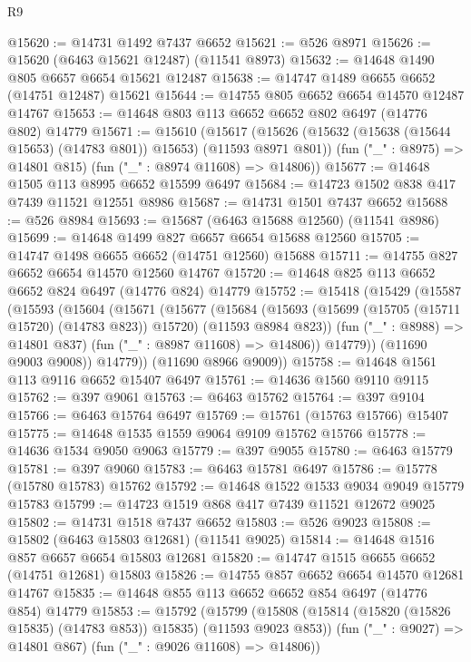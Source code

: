 \begin{lexlean}{R9}
\begin{coremodule}
@15620 := @14731 @1492 @7437 @6652
@15621 := @526 @8971
@15626 := @15620 (@6463 @15621 @12487) (@11541 @8973)
@15632 := @14648 @1490 @805 @6657 @6654 @15621 @12487
@15638 := @14747 @1489 @6655 @6652 (@14751 @12487) @15621
@15644 := @14755 @805 @6652 @6654 @14570 @12487 @14767
@15653 := @14648 @803 @113 @6652 @6652 @802 @6497 (@14776 @802) @14779
@15671 := @15610
    (@15617
      (@15626 (@15632 (@15638 (@15644 @15653) (@14783 @801)) @15653) (@11593 @8971 @801))
      (fun ("_" : @8975) => @14801 @815)
      (fun ("_" : @8974 @11608) => @14806))
@15677 := @14648 @1505 @113 @8995 @6652 @15599 @6497
@15684 := @14723 @1502 @838 @417 @7439 @11521 @12551 @8986
@15687 := @14731 @1501 @7437 @6652
@15688 := @526 @8984
@15693 := @15687 (@6463 @15688 @12560) (@11541 @8986)
@15699 := @14648 @1499 @827 @6657 @6654 @15688 @12560
@15705 := @14747 @1498 @6655 @6652 (@14751 @12560) @15688
@15711 := @14755 @827 @6652 @6654 @14570 @12560 @14767
@15720 := @14648 @825 @113 @6652 @6652 @824 @6497 (@14776 @824) @14779
@15752 := @15418
    (@15429
      (@15587
        (@15593
          (@15604
            (@15671
              (@15677
                (@15684
                  (@15693
                    (@15699 (@15705 (@15711 @15720) (@14783 @823)) @15720)
                    (@11593 @8984 @823))
                  (fun ("_" : @8988) => @14801 @837)
                  (fun ("_" : @8987 @11608) => @14806))
                @14779))
            (@11690 @9003 @9008))
          @14779))
      (@11690 @8966 @9009))
@15758 := @14648 @1561 @113 @9116 @6652 @15407 @6497
@15761 := @14636 @1560 @9110 @9115
@15762 := @397 @9061
@15763 := @6463 @15762
@15764 := @397 @9104
@15766 := @6463 @15764 @6497
@15769 := @15761 (@15763 @15766) @15407
@15775 := @14648 @1535 @1559 @9064 @9109 @15762 @15766
@15778 := @14636 @1534 @9050 @9063
@15779 := @397 @9055
@15780 := @6463 @15779
@15781 := @397 @9060
@15783 := @6463 @15781 @6497
@15786 := @15778 (@15780 @15783) @15762
@15792 := @14648 @1522 @1533 @9034 @9049 @15779 @15783
@15799 := @14723 @1519 @868 @417 @7439 @11521 @12672 @9025
@15802 := @14731 @1518 @7437 @6652
@15803 := @526 @9023
@15808 := @15802 (@6463 @15803 @12681) (@11541 @9025)
@15814 := @14648 @1516 @857 @6657 @6654 @15803 @12681
@15820 := @14747 @1515 @6655 @6652 (@14751 @12681) @15803
@15826 := @14755 @857 @6652 @6654 @14570 @12681 @14767
@15835 := @14648 @855 @113 @6652 @6652 @854 @6497 (@14776 @854) @14779
@15853 := @15792
    (@15799
      (@15808 (@15814 (@15820 (@15826 @15835) (@14783 @853)) @15835) (@11593 @9023 @853))
      (fun ("_" : @9027) => @14801 @867)
      (fun ("_" : @9026 @11608) => @14806))

\end{coremodule}
\end{lexlean}
